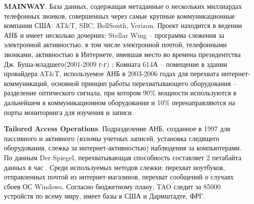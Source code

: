 	\textbf{MAINWAY}. База данных, содержащая метаданные о нескольких миллиардах телефонных звонков, совершенных через самые крупные коммуникационные компании США: AT\&T, SBC, BellSouth, Verizon. Проект находится в ведении  АНБ и имеет несколько дочерних: Stellar Wing -- программа слежения за электронной активностью, в том числе электронной почтой, телефонными звонками, активностью в Интернете, имевшая место во времена президентства Дж. Буша-младшего(2001-2009 г-г) \cite{MAINWAY1} \cite{MAINWAY2};%
	Комната 614А -- помещение в здании провайдера AT\&T, используемое АНБ в 2003-2006 годах для перехвата интернет-коммуникаций, \cite{614-1} \cite{614-2} %
	основной принцип работы перехватывающего оборудования -- разделение  оптического сигнала, при котором 90\% мощности  используются в дальнейшем в коммуникационном оборудовании и 10\% перенаправляются на порты мониторинга для изучения и записи.
	
	\textbf{Tailored Access Operations}. Подразделение АНБ, созданное в 1997 для пассивного и активного (взломы учетных записей, установка следящего оборудования, слежка за интернет-активностью) наблюдения за компьютерами. По данным Der Spiegel, перехватывающая способность составляет 2 петабайта данных в час\cite{SPIEGEL} \cite{TAO2} \cite{TAO3}. %
	Среди используемых методов слежки: перехват ноутбуков, отправленных почтой из интернет-магазинов, перехват сообщений о случаях сбоев ОС Windows. Согласно бюджетному плану, TAO следит за 85000 устройств по всему миру, имеет базы в США и Дармштадте, ФРГ. 
	

